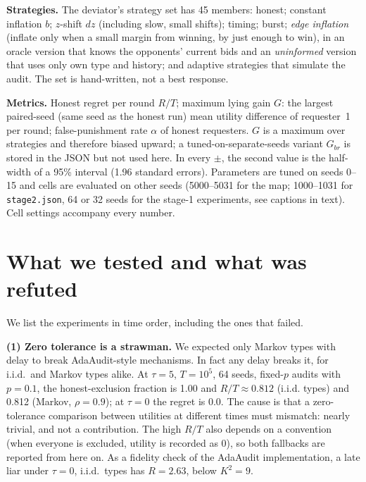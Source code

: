 \documentclass[10pt]{article}
\begin{document}
\textbf{Strategies.} The deviator's strategy set has 45 members: honest; constant inflation $b$; $z$-shift $dz$ (including slow, small shifts); timing; burst; \emph{edge inflation} (inflate only when a small margin from winning, by just enough to win), in an oracle version that knows the opponents' current bids and an \emph{uninformed} version that uses only own type and history; and adaptive strategies that simulate the audit. The set is hand-written, not a best response.

\textbf{Metrics.} Honest regret per round $R/T$; maximum lying gain $G$: the largest paired-seed (same seed as the honest run) mean utility difference of requester~1 per round; false-punishment rate $\alpha$ of honest requesters. $G$ is a maximum over strategies and therefore biased upward; a tuned-on-separate-seeds variant $G_{br}$ is stored in the JSON but not used here. In every $\pm$, the second value is the half-width of a 95\% interval (1.96 standard errors). Parameters are tuned on seeds 0--15 and cells are evaluated on other seeds (5000--5031 for the map; 1000--1031 for \texttt{stage2.json}, 64 or 32 seeds for the stage-1 experiments, see captions in text). Cell settings accompany every number.

\section{What we tested and what was refuted}\label{sec:timeline}
We list the experiments in time order, including the ones that failed.

\textbf{(1) Zero tolerance is a strawman.} We expected only Markov types with delay to break AdaAudit-style mechanisms. In fact any delay breaks it, for i.i.d.\ and Markov types alike. At $\tau{=}5$, $T{=}10^5$, 64 seeds, fixed-$p$ audits with $p{=}0.1$, the honest-exclusion fraction is 1.00 and $R/T\approx0.812$ (i.i.d. types) and 0.812 (Markov, $\rho{=}0.9$); at $\tau{=}0$ the regret is 0.0. The cause is that a zero-tolerance comparison between utilities at different times must mismatch: nearly trivial, and not a contribution. The high $R/T$ also depends on a convention (when everyone is excluded, utility is recorded as $0$), so both fallbacks are reported from here on. As a fidelity check of the AdaAudit implementation, a late liar under $\tau{=}0$, i.i.d.\ types has $R=2.63$, below $K^2=9$.
\end{document}
